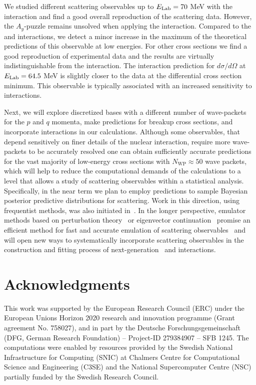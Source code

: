 \documentclass[aps,prc,showpacs,twocolumn,floatfix,nobibnotes,nofootinbib,amsmath,amssymb,longbibliography]{revtex4-2}
\begin{document}
We studied different \nd{} scattering observables up to $E_\text{Lab}=70$ MeV with
the \NNLOopt{} \NN{} interaction and find a good overall reproduction of
the scattering data. However, the $A_y$-puzzle remains unsolved when applying
the \NNLOopt{} interaction. Compared to the \NijmI{} and
\INNNLO{} \NN{} interactions, we detect a minor increase in the
maximum of the theoretical predictions of this observable at low
energies. For other cross sections we find a good reproduction of
experimental data and the results are virtually indistinguishable from
the \INNNLO{} interaction. The \NNLOopt{} interaction prediction
for $d\sigma/d\Omega$ at $E_\text{Lab}=64.5$ MeV is slightly closer to the
data at the differential cross section minimum. This observable is
typically associated with an increased sensitivity to
\NNN{} interactions.

Next, we will explore discretized bases with a different number of
wave-packets for the $p$ and $q$ momenta, make predictions for breakup
cross sections, and incorporate \NNN{} interactions in our
calculations. Although some observables, that depend sensitively on
finer details of the nuclear interaction, require more wave-packets to
be accurately resolved one can obtain sufficiently accurate
predictions for the vast majority of low-energy \Nd{} cross sections
with $N_\text{WP}\approx 50$ wave packets, which will help to reduce
the computational demands of the calculations to a level that allows a
study of \Nd{} scattering observables within a statistical
analysis. Specifically, in the near term we plan to employ \wpcd{}
predictions to sample Bayesian posterior predictive distributions for
\Nd{} scattering. Work in this direction, using frequentist methods,
was also initiated in~\cite {Skibinski:2018dot}. In the longer
perspective, emulator methods based on perturbation
theory~\cite{Witala:2021xqm} or eigenvector continuation~\cite
{Frame:2017fah} promise an efficient method for fast and accurate
emulation of scattering observables~\cite
{Furnstahl:2020abp,Bai:2021xok,Zhang:2021jmi,Drischler:2021qoy} and
will open new ways to systematically incorporate \Nd{} scattering
observables in the construction and fitting process of next-generation
\NN~and \NNN{} interactions.

\section*{Acknowledgments} This work was supported by the European Research
 Council (ERC) under the European Unions Horizon 2020 research and innovation
 programme (Grant agreement No. 758027), and in part by the  Deutsche
 Forschungsgemeinschaft (DFG,  German Research Foundation) -- Project-ID
 279384907 -- SFB 1245. The computations were enabled by resources provided
 by the Swedish National Infrastructure for Computing (SNIC) at Chalmers
 Centre for Computational Science and Engineering (C3SE) and the National
 Supercomputer Centre (NSC) partially funded by the Swedish Research
 Council.
\end{document}
